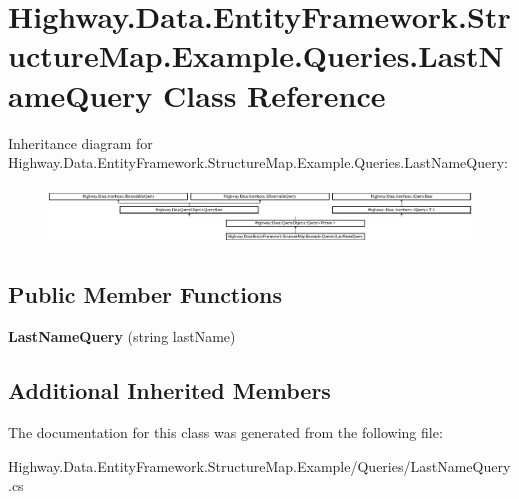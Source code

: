 \hypertarget{class_highway_1_1_data_1_1_entity_framework_1_1_structure_map_1_1_example_1_1_queries_1_1_last_name_query}{\section{Highway.\-Data.\-Entity\-Framework.\-Structure\-Map.\-Example.\-Queries.\-Last\-Name\-Query Class Reference}
\label{class_highway_1_1_data_1_1_entity_framework_1_1_structure_map_1_1_example_1_1_queries_1_1_last_name_query}
}
Inheritance diagram for Highway.\-Data.\-Entity\-Framework.\-Structure\-Map.\-Example.\-Queries.\-Last\-Name\-Query\-:\begin{figure}[H]
\begin{center}
\leavevmode
\includegraphics[height=1.578577cm]{class_highway_1_1_data_1_1_entity_framework_1_1_structure_map_1_1_example_1_1_queries_1_1_last_name_query}
\end{center}
\end{figure}
\subsection*{Public Member Functions}
\begin{DoxyCompactItemize}
\item 
\hypertarget{class_highway_1_1_data_1_1_entity_framework_1_1_structure_map_1_1_example_1_1_queries_1_1_last_name_query_a42f2520b716b1275171ee7cc8e18c97f}{{\bfseries Last\-Name\-Query} (string last\-Name)}\label{class_highway_1_1_data_1_1_entity_framework_1_1_structure_map_1_1_example_1_1_queries_1_1_last_name_query_a42f2520b716b1275171ee7cc8e18c97f}

\end{DoxyCompactItemize}
\subsection*{Additional Inherited Members}


The documentation for this class was generated from the following file\-:\begin{DoxyCompactItemize}
\item 
Highway.\-Data.\-Entity\-Framework.\-Structure\-Map.\-Example/\-Queries/Last\-Name\-Query.\-cs\end{DoxyCompactItemize}
